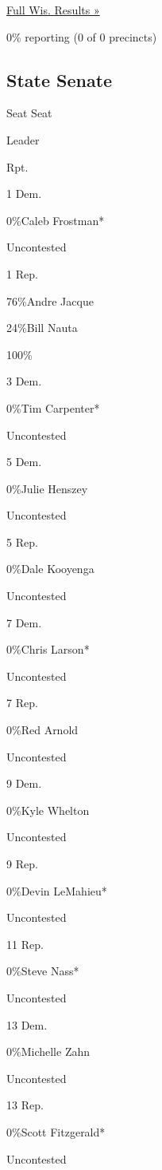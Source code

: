 \href{https://www.nytimes3xbfgragh.onion/elections/results/wisconsin}{Full
Wis. Results »}

0\% reporting (0 of 0 precincts)

\hypertarget{state-senate}{%
\subsection{State Senate}\label{state-senate}}

Seat Seat

Leader

Rpt.

1 Dem.

 0\%Caleb Frostman*

Uncontested

1 Rep.

 76\%Andre Jacque

 24\%Bill Nauta

100\%

3 Dem.

 0\%Tim Carpenter*

Uncontested

5 Dem.

 0\%Julie Henszey

Uncontested

5 Rep.

 0\%Dale Kooyenga

Uncontested

7 Dem.

 0\%Chris Larson*

Uncontested

7 Rep.

 0\%Red Arnold

Uncontested

9 Dem.

 0\%Kyle Whelton

Uncontested

9 Rep.

 0\%Devin LeMahieu*

Uncontested

11 Rep.

 0\%Steve Nass*

Uncontested

13 Dem.

 0\%Michelle Zahn

Uncontested

13 Rep.

 0\%Scott Fitzgerald*

Uncontested

